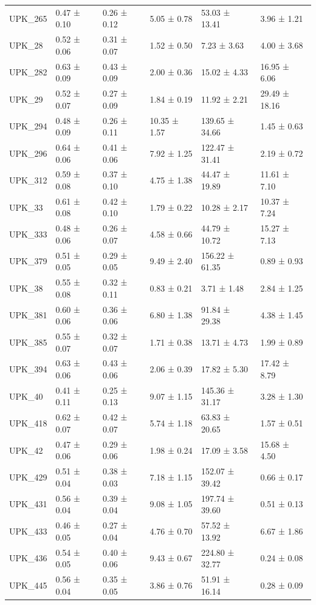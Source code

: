 \begin{tabular}{llllll}
UPK_265 & 0.47 ± 0.10 & 0.26 ± 0.12 & 5.05 ± 0.78 & 53.03 ± 13.41 & 3.96 ± 1.21 \\
UPK_28 & 0.52 ± 0.06 & 0.31 ± 0.07 & 1.52 ± 0.50 & 7.23 ± 3.63 & 4.00 ± 3.68 \\
UPK_282 & 0.63 ± 0.09 & 0.43 ± 0.09 & 2.00 ± 0.36 & 15.02 ± 4.33 & 16.95 ± 6.06 \\
UPK_29 & 0.52 ± 0.07 & 0.27 ± 0.09 & 1.84 ± 0.19 & 11.92 ± 2.21 & 29.49 ± 18.16 \\
UPK_294 & 0.48 ± 0.09 & 0.26 ± 0.11 & 10.35 ± 1.57 & 139.65 ± 34.66 & 1.45 ± 0.63 \\
UPK_296 & 0.64 ± 0.06 & 0.41 ± 0.06 & 7.92 ± 1.25 & 122.47 ± 31.41 & 2.19 ± 0.72 \\
UPK_312 & 0.59 ± 0.08 & 0.37 ± 0.10 & 4.75 ± 1.38 & 44.47 ± 19.89 & 11.61 ± 7.10 \\
UPK_33 & 0.61 ± 0.08 & 0.42 ± 0.10 & 1.79 ± 0.22 & 10.28 ± 2.17 & 10.37 ± 7.24 \\
UPK_333 & 0.48 ± 0.06 & 0.26 ± 0.07 & 4.58 ± 0.66 & 44.79 ± 10.72 & 15.27 ± 7.13 \\
UPK_379 & 0.51 ± 0.05 & 0.29 ± 0.05 & 9.49 ± 2.40 & 156.22 ± 61.35 & 0.89 ± 0.93 \\
UPK_38 & 0.55 ± 0.08 & 0.32 ± 0.11 & 0.83 ± 0.21 & 3.71 ± 1.48 & 2.84 ± 1.25 \\
UPK_381 & 0.60 ± 0.06 & 0.36 ± 0.06 & 6.80 ± 1.38 & 91.84 ± 29.38 & 4.38 ± 1.45 \\
UPK_385 & 0.55 ± 0.07 & 0.32 ± 0.07 & 1.71 ± 0.38 & 13.71 ± 4.73 & 1.99 ± 0.89 \\
UPK_394 & 0.63 ± 0.06 & 0.43 ± 0.06 & 2.06 ± 0.39 & 17.82 ± 5.30 & 17.42 ± 8.79 \\
UPK_40 & 0.41 ± 0.11 & 0.25 ± 0.13 & 9.07 ± 1.15 & 145.36 ± 31.17 & 3.28 ± 1.30 \\
UPK_418 & 0.62 ± 0.07 & 0.42 ± 0.07 & 5.74 ± 1.18 & 63.83 ± 20.65 & 1.57 ± 0.51 \\
UPK_42 & 0.47 ± 0.06 & 0.29 ± 0.06 & 1.98 ± 0.24 & 17.09 ± 3.58 & 15.68 ± 4.50 \\
UPK_429 & 0.51 ± 0.04 & 0.38 ± 0.03 & 7.18 ± 1.15 & 152.07 ± 39.42 & 0.66 ± 0.17 \\
UPK_431 & 0.56 ± 0.04 & 0.39 ± 0.04 & 9.08 ± 1.05 & 197.74 ± 39.60 & 0.51 ± 0.13 \\
UPK_433 & 0.46 ± 0.05 & 0.27 ± 0.04 & 4.76 ± 0.70 & 57.52 ± 13.92 & 6.67 ± 1.86 \\
UPK_436 & 0.54 ± 0.05 & 0.40 ± 0.06 & 9.43 ± 0.67 & 224.80 ± 32.77 & 0.24 ± 0.08 \\
UPK_445 & 0.56 ± 0.04 & 0.35 ± 0.05 & 3.86 ± 0.76 & 51.91 ± 16.14 & 0.28 ± 0.09 \\

\end{tabular}
